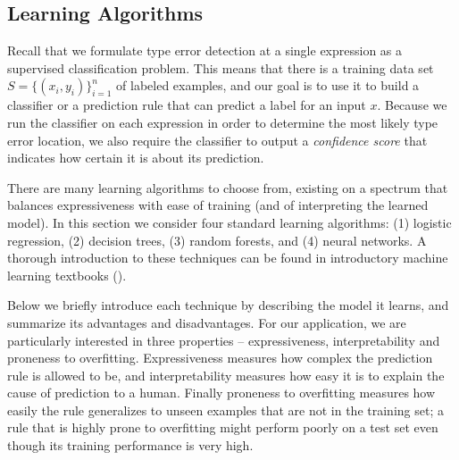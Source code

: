 \subsection{Learning Algorithms}
\label{sec:models}
\lstDeleteShortInline{|} %

Recall that we formulate type error detection at a single expression as a supervised classification problem. This means that there is a training data set $S = \{ (x_i, y_i) \}_{i=1}^n$ of labeled examples, and our goal is to use it to build a classifier or a prediction rule that can predict a label for an input $x$. Because we run the classifier on each expression in order to determine the most likely type error location, we also require the classifier to output a {\em{confidence score}} that indicates how certain it is about its prediction. 


%
%

There are many learning algorithms to choose from, existing
on a spectrum that balances expressiveness with ease of training (and of
interpreting the learned model). In this section we consider four standard learning algorithms: (1) logistic regression, (2) decision trees, (3) random forests, and (4) neural networks. A thorough introduction to these techniques can be found in introductory
machine learning textbooks (\eg \cite{FriedmanHastieTibshirani2000}).
%

Below we briefly introduce each technique by describing the model it learns, and summarize its advantages and disadvantages. For our application, we are particularly interested in three properties -- expressiveness, interpretability and proneness to overfitting. Expressiveness measures how complex the prediction rule is allowed to be, and interpretability measures how easy it is to explain the cause of prediction to a human. Finally proneness to overfitting measures how easily the rule generalizes to unseen examples that are not in the training set; a rule that is highly prone to overfitting might perform poorly on a test set even though its training performance is very high.


